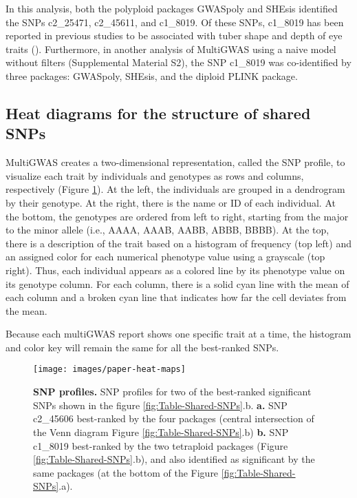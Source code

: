 \documentclass{article}
\begin{document}
In this analysis, both the polyploid packages GWASpoly and SHEsis identified the SNPs c2\_25471, c2\_45611, and c1\_8019. Of these SNPs, c1\_8019 has been reported in previous studies to be associated with tuber shape and depth of eye traits (\cite{Rosyara2016, Sharma2018}). Furthermore, in another analysis of MultiGWAS using a naive model without filters (Supplemental Material S2), the SNP c1\_8019 was co-identified by three packages: GWASpoly, SHEsis, and the diploid PLINK package.

\subsection{Heat diagrams for the structure of shared SNPs}

MultiGWAS creates a two-dimensional representation, called the SNP profile, to visualize each trait by individuals and genotypes as rows and columns, respectively (Figure \ref{fig:SNP-profiles}). At the left, the individuals are grouped in a dendrogram by their genotype. At the right, there is the name or ID of each individual. At the bottom, the genotypes are ordered from left to right, starting from the major to the minor allele (i.e., AAAA, AAAB, AABB, ABBB, BBBB). At the top, there is a description of the trait based on a histogram of frequency (top left) and an assigned color for each numerical phenotype value using a grayscale (top right). Thus, each individual appears as a colored line by its phenotype value on its genotype column. For each column, there is a solid cyan line with the mean of each column and a broken cyan line that indicates how far the cell deviates from the
mean.

Because each multiGWAS report shows one specific trait at a time, the histogram and color key will remain the same for all the best-ranked
SNPs.

\begin{figure}[H]
\begin{centering}
\texttt{[image: images/paper-heat-maps]}
\par\end{centering}
\caption{\textbf{SNP profiles. }{SNP profiles for two of the best-ranked significant SNPs shown in the figure \ref{fig:Table-Shared-SNPs}.b.
\textbf{a.} SNP c2\_45606 best-ranked by the four packages (central intersection of the Venn diagram Figure \ref{fig:Table-Shared-SNPs}.b) \textbf{b.} SNP c1\_8019 best-ranked by the two tetraploid packages (Figure \ref{fig:Table-Shared-SNPs}.b), and also identified as significant by the same packages (at the bottom of the Figure  \ref{fig:Table-Shared-SNPs}.a). \label{fig:SNP-profiles}}}
\end{figure}
\end{document}
